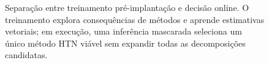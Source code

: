 \begin{figure}[htbp]
{%
}
\caption{Separação entre treinamento pré-implantação e decisão online. O treinamento
explora consequências de métodos e aprende estimativas vetoriais; em execução,
uma inferência mascarada seleciona um único método HTN viável sem expandir todas
as decomposições candidatas.}
\label{fig:offline-online-morl}
\end{figure}
